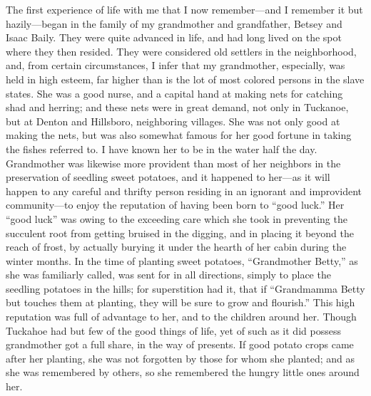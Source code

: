 The first experience of life with me that I now remember---and I
remember it but hazily---began in the family of my grandmother and
grandfather, Betsey and Isaac Baily. They were quite advanced in life,
and had long lived on the spot where they then resided. They were
considered old settlers in the neighborhood, and, from certain
circumstances, I infer that my grandmother, especially, was held in high
esteem, far higher than is the lot of most colored persons in the slave
states. She was a good nurse, and a capital hand at making nets for
catching shad and herring; and these nets were in great demand, not
{\protect\hypertarget{36}{}{}}only in Tuckanoe, but at Denton and
Hillsboro, neighboring villages. She was not only good at making the
nets, but was also somewhat famous for her good fortune in taking the
fishes referred to. I have known her to be in the water half the day.
Grandmother was likewise more provident than most of her neighbors in
the preservation of seedling sweet potatoes, and it happened to her---as
it will happen to any careful and thrifty person residing in an ignorant
and improvident community---to enjoy the reputation of having been born
to ``good luck.'' Her ``good luck'' was owing to the exceeding care
which she took in preventing the succulent root from getting bruised in
the digging, and in placing it beyond the reach of frost, by actually
burying it under the hearth of her cabin during the winter months. In
the time of planting sweet potatoes, ``Grandmother Betty,'' as she was
familiarly called, was sent for in all directions, simply to place the
seedling potatoes in the hills; for superstition had it, that if
``Grandmamma Betty but touches them at planting, they will be sure to
grow and flourish.'' This high reputation was full of advantage to her,
and to the children around her. Though Tuckahoe had but few of the good
things of life, yet of such as it did possess grandmother got a full
share, in the way of presents. If good potato crops came after her
planting, she was not forgotten by those for whom she planted; and as
she was remembered by others, so she remembered the hungry little ones
around her.

